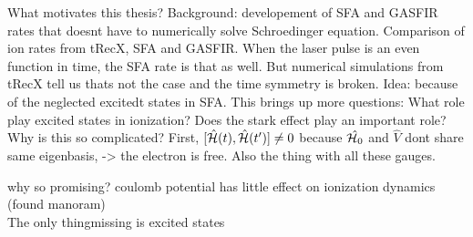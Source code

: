 What motivates this thesis? Background: developement of SFA and GASFIR rates that doesnt have to numerically solve Schroedinger equation.
Comparison of ion rates from tRecX, SFA and GASFIR. When the laser pulse is an even function in time, the SFA rate is that as well. 
But numerical simulations from tRecX tell us thats not the case and the time symmetry is broken. Idea: because of the neglected excitedt states in SFA.
This brings up more questions: What role play excited states in ionization? Does the stark effect play an important role?\\
Why is this so complicated? First, $[\hat{\mathcal{H}}(t), \hat{\mathcal{H}}(t')] \neq 0$ because $\hat{\mathcal{H}_0}$ and $\hat{V}$ dont share same eigenbasis, -> the electron is free. Also the thing with all these gauges.



why so promising? coulomb potential has little effect on ionization dynamics (found manoram)\\
The only thingmissing is excited states